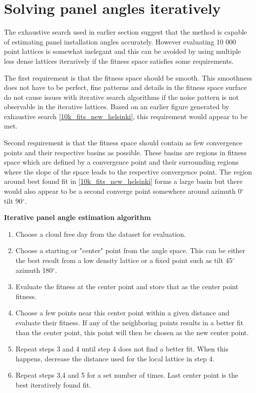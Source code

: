 \newpage

\clearpage

\section{Solving panel angles iteratively}
The exhaustive search used in earlier section suggest that the method is capable of estimating panel installation angles accurately. However evaluating 10 000 point lattices is somewhat inelegant and this can be avoided by using multiple less dense lattices iterarively if the fitness space satisfies some requirements.

The first requirement is that the fitness space should be smooth. This smoothness does not have to be perfect, fine patterns and details in the fitness space surface do not cause issues with iterative search algorithms if the noise pattern is not observable in the iterative lattices. Based on an earlier figure generated by exhaustive search \ref{10k_fits_new_helsinki}, this requirement would appear to be met.

Second requirement is that the fitness space should contain as few convergence points and their respective basins as possible. These basins are regions in fitness space which are defined by a convergence point and their surrounding regions where the slope of the space leads to the respective convergence point. The region around best found fit in \ref{10k_fits_new_helsinki} forms a large basin but there would also appear to be a second converge point somewhere around azimuth 0$^\circ$ tilt 90$^\circ$.

 

\noindent \textbf{Iterative panel angle estimation algorithm}
\begin{enumerate}
	\item Choose a cloud free day from the dataset for evaluation.
  \item Choose a starting or "center" point from the angle space. This can be either the best result from a low density lattice or a fixed point such as tilt 45$^\circ$ azimuth 180$^\circ$.
  \item Evaluate the fitness at the center point and store that as the center point fitness.
  \item Choose a few points near this center point within a given distance and evaluate their fitness. If any of the neighboring points results in a better fit than the center point, this point will then be chosen as the new center point.
  \item Repeat steps 3 and 4 until step 4 does not find a better fit. When this happens, decrease the distance used for the local lattice in step 4.
  \item Repeat steps 3,4 and 5 for a set number of times. Last center point is the best iteratively found fit.
\end{enumerate}


